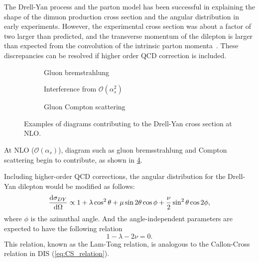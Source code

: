 \documentclass[../main.tex]{subfiles}
\begin{document}
The Drell-Yan process and the parton model has been successful in explaining the shape of
the dimuon production cross section and the angular distribution in early experiments. However,
the  experimental cross section was about a factor of two larger than predicted, and the
transverse momentum of the dilepton is larger than expected from the convolution of the intrinsic
parton momenta~\cite{mcgaughey1999}. These discrepancies can be resolved if higher order
QCD correction is included.
\begin{figure}[htbp!]
	\centering
	\begin{subfigure}{0.45\linewidth}
		\centering
		
		\caption{Gluon bremstrahlung}
		\label{subfig:DY_gb}
	\end{subfigure}
	\begin{subfigure}{0.45\linewidth}
		\centering
		
		\caption{Interference from $\mathcal{O}(\alpha^2_s)$}
		\label{subfig:DY_interfer}
	\end{subfigure}

	\begin{subfigure}{\linewidth}
		\centering
		\begin{subfigure}{0.45\linewidth}
			\centering
			
		\end{subfigure}
		\begin{subfigure}{0.45\linewidth}
			\centering
			
		\end{subfigure}
		\caption{Gluon Compton scattering}
		\label{subfig:DY_gc}
	\end{subfigure}
	\caption{Examples of diagrams contributing to the Drell-Yan cross section
		at NLO.}
	\label{fig:NLO_DY}
\end{figure}
At NLO ($\mathcal{O}\left(\alpha_s\right)$), diagram such as gluon bremsstrahlung
and Compton scattering begin to contribute, as shown in \cref{fig:NLO_DY}.



Including higher-order QCD corrections, the angular distribution for the Drell-Yan dilepton would
be modified as follows:
\begin{equation}
	\dv{\sigma_{DY}}{\Omega} \propto 1 + \lambda \cos^2\theta + \mu \sin 2\theta\cos\phi +\frac{\nu}{2}\sin^2\theta\cos 2\phi,
\end{equation}
where $\phi$ is the azimuthal angle. And the angle-independent parameters are expected to have the
following relation~\cite{lam1980}
\begin{equation}
	1-\lambda-2\nu=0.
\end{equation}
This relation, known as the Lam-Tong relation, is analogous to the Callon-Cross relation in DIS
(\cref{eq:CS_relation}).
\end{document}
